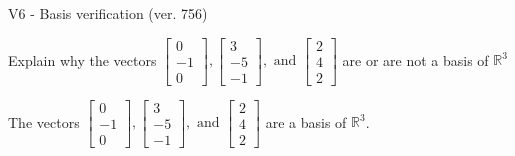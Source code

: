 \begin{exercise}
  \begin{exerciseTitle}V6 - Basis verification (ver. 756)\end{exerciseTitle}
  \begin{exerciseStatement}
    Explain why the vectors \(\left[\begin{array}{r}
0 \\
-1 \\
0
\end{array}\right] , \left[\begin{array}{r}
3 \\
-5 \\
-1
\end{array}\right] , \text{ and } \left[\begin{array}{r}
2 \\
4 \\
2
\end{array}\right]\) are or are not a basis of \(\mathbb{R}^3\)	


  \end{exerciseStatement}
  \begin{exerciseAnswer}
   The vectors \(\left[\begin{array}{r}
0 \\
-1 \\
0
\end{array}\right] , \left[\begin{array}{r}
3 \\
-5 \\
-1
\end{array}\right] , \text{ and } \left[\begin{array}{r}
2 \\
4 \\
2
\end{array}\right]\) 
  	 are  a basis of \(\mathbb{R}^3\).
  


  \end{exerciseAnswer}
\end{exercise}